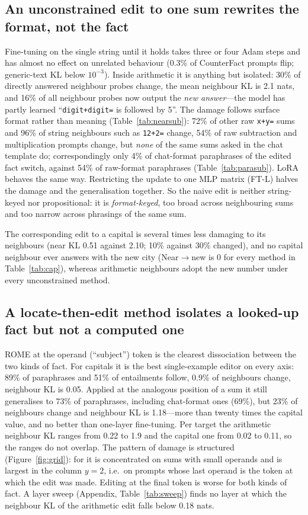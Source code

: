\subsection{An unconstrained edit to one sum rewrites the format, not the fact}
Fine-tuning on the single string until it holds takes three or four Adam steps and has almost no effect on unrelated behaviour (0.3\% of CounterFact prompts flip; generic-text KL below $10^{-3}$). Inside arithmetic it is anything but isolated: 30\% of directly answered neighbour probes change, the mean neighbour KL is 2.1 nats, and 16\% of all neighbour probes now output the \emph{new answer}---the model has partly learned ``\texttt{digit+digit=} is followed by 5''. The damage follows surface format rather than meaning (Table~\ref{tab:nearsub}): 72\% of other raw \texttt{x+y=} sums and 96\% of string neighbours such as \texttt{12+2=} change, 54\% of raw subtraction and multiplication prompts change, but \emph{none} of the same sums asked in the chat template do; correspondingly only 4\% of chat-format paraphrases of the edited fact switch, against 54\% of raw-format paraphrases (Table~\ref{tab:parasub}). LoRA behaves the same way. Restricting the update to one MLP matrix (FT-L) halves the damage and the generalisation together. So the naive edit is neither string-keyed nor propositional: it is \emph{format-keyed}, too broad across neighbouring sums and too narrow across phrasings of the same sum.

The corresponding edit to a capital is several times less damaging to its neighbours (near KL 0.51 against 2.10; 10\% against 30\% changed), and no capital neighbour ever answers with the new city (Near$\to$new is 0 for every method in Table~\ref{tab:cap}), whereas arithmetic neighbours adopt the new number under every unconstrained method.

\subsection{A locate-then-edit method isolates a looked-up fact but not a computed one}
ROME at the operand (``subject'') token is the clearest dissociation between the two kinds of fact. For capitals it is the best single-example editor on every axis: 89\% of paraphrases and 51\% of entailments follow, 0.9\% of neighbours change, neighbour KL is 0.05. Applied at the analogous position of a sum it still generalises to 73\% of paraphrases, including chat-format ones (69\%), but 23\% of neighbours change and neighbour KL is 1.18---more than twenty times the capital value, and no better than one-layer fine-tuning. Per target the arithmetic neighbour KL ranges from 0.22 to 1.9 and the capital one from 0.02 to 0.11, so the ranges do not overlap. The pattern of damage is structured (Figure~\ref{fig:grid}): for  it is concentrated on sums with small operands and is largest in the column $y=2$, i.e.\ on prompts whose last operand is the token at which the edit was made. Editing at the final token is worse for both kinds of fact. A layer sweep (Appendix, Table~\ref{tab:sweep}) finds no layer at which the neighbour KL of the arithmetic edit falls below 0.18 nats.

